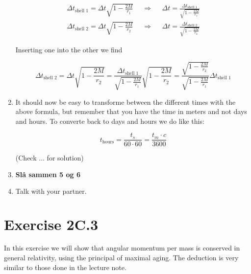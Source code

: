 \documentclass[a4paper,10pt,english]{article}
\begin{document}
\begin{enumerate}
\begin{align*}
\Delta t_{\text{shell 1}}=\Delta t\sqrt{1-\frac{2M}{r_{1}}} &&\Rightarrow&& \Delta t=\frac{\Delta t_{\text{shell 1}}}{\sqrt{1-\frac{2M}{r_{1}}}}\\
\Delta t_{\text{shell 2}}=\Delta t\sqrt{1-\frac{2M}{r_{2}}} &&\Rightarrow&& \Delta t=\frac{\Delta t_{\text{shell 2}}}{\sqrt{1-\frac{2M}{r_{2}}}}
\end{align*}

Inserting one into the other we find

\begin{equation*}
\Delta t_{\text{shell 2}}=\Delta t\sqrt{1-\frac{2M}{r_{2}}}=\frac{\Delta t_{\text{shell 1}}}{\sqrt{1-\frac{2M}{r_{1}}}}\sqrt{1-\frac{2M}{r_{2}}}=\frac{\sqrt{1-\frac{2M}{r_{2}}}}{\sqrt{1-\frac{2M}{r_{1}}}}\Delta t_{\text{shell 1}}
\end{equation*}

\item It should now be easy to transforme between the different times with the above formula, but remember that you have the time in meters and not days and hours. To converte back to days and hours we do like this:

\begin{equation*}
t_{\text{hours}}=\frac{t_{s}}{60\cdot60}=\frac{t_{m}\cdot c}{3600}
\end{equation*}

(Check $\ldots$ for solution)

\item \textbf{Slå sammen 5 og 6}

\item Talk with your partner.
  
\end{enumerate}








\section*{Exercise 2C.3}

In this exercise we will show that angular momentum per mass is conserved in general relativity, using the principal of maximal aging. The deduction is very similar to those done in the lecture note.
\end{document}
